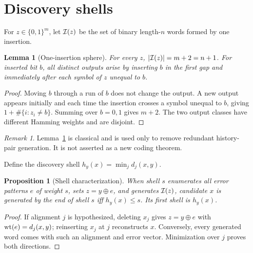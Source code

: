 \documentclass[11pt]{article}
\newtheorem{proposition}[theorem]{Proposition}
\newtheorem{lemma}[theorem]{Lemma}
\theoremstyle{remark}\newtheorem{remark}[theorem]{Remark}
\begin{document}
\section{Discovery shells}
For $z\in\{0,1\}^m$, let $\mathcal I(z)$ be the set of binary length-$n$ words formed by one insertion.
\begin{lemma}[One-insertion sphere]\label{lem:sphere}
For every $z$, $|\mathcal I(z)|=m+2=n+1$. For inserted bit $b$, all distinct outputs arise by inserting
$b$ in the first gap and immediately after each symbol of $z$ unequal to $b$.
\end{lemma}
\begin{proof}
Moving $b$ through a run of $b$ does not change the output. A new output appears initially and each
time the insertion crosses a symbol unequal to $b$, giving $1+\#\{i:z_i\ne b\}$. Summing over
$b=0,1$ gives $m+2$. The two output classes have different Hamming weights and are disjoint.
\end{proof}
\begin{remark}
Lemma~\ref{lem:sphere} is classical and is used only to remove redundant history-pair generation.
It is not asserted as a new coding theorem.
\end{remark}
Define the discovery shell $h_y(x)=\min_jd_j(x,y)$.
\begin{proposition}[Shell characterization]\label{prop:shell}
When shell $s$ enumerates all error patterns $e$ of weight $s$, sets $z=y\oplus e$, and generates
$\mathcal I(z)$, candidate $x$ is generated by the end of shell $s$ iff $h_y(x)\le s$. Its first shell is
$h_y(x)$.
\end{proposition}
\begin{proof}
If alignment $j$ is hypothesized, deleting $x_j$ gives $z=y\oplus e$ with
$\operatorname{wt}(e)=d_j(x,y)$; reinserting $x_j$ at $j$ reconstructs $x$. Conversely, every generated word
comes with such an alignment and error vector. Minimization over $j$ proves both directions.
\end{proof}
\end{document}
